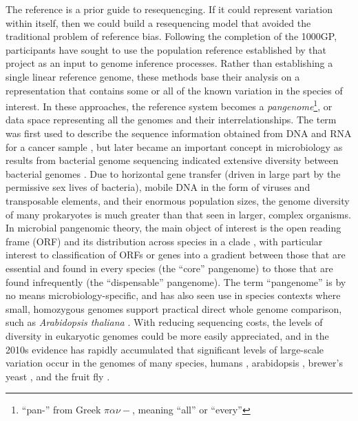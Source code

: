 The reference is a prior guide to resequencging.
If it could represent variation within itself, then we could build a resequencing model that avoided the traditional problem of reference bias.
Following the completion of the 1000GP, participants have sought to use the population reference established by that project as an input to genome inference processes.
Rather than establishing a single linear reference genome, these methods base their analysis on a representation that contains some or all of the known variation in the species of interest.
In these approaches, the reference system becomes a \emph{pangenome}\footnote{``pan-'' from Greek $\pi\alpha\nu-$, meaning ``all'' or ``every''}, or data space representing all the genomes and their interrelationships.
The term was first used to describe the sequence information obtained from DNA and RNA for a cancer sample \cite{sigaux2000cancer}, but later became an important concept in microbiology as results from bacterial genome sequencing indicated extensive diversity between bacterial genomes \cite{tettelin2005genome,medini2005microbial}.
Due to horizontal gene transfer (driven in large part by the permissive sex lives of bacteria), mobile DNA in the form of viruses and transposable elements, and their enormous population sizes, the genome diversity of many prokaryotes is much greater than that seen in larger, complex organisms.
In microbial pangenomic theory, the main object of interest is the open reading frame (ORF) and its distribution across species in a clade \cite{vernikos2015ten}, with particular interest to classification of ORFs or genes into a gradient between those that are essential and found in every species (the ``core'' pangenome) to those that are found infrequently (the ``dispensable'' pangenome).
The term ``pangenome'' is by no means microbiology-specific, and has also seen use in species contexts where small, homozygous genomes support practical direct whole genome comparison, such as \emph{Arabidopsis thaliana} \cite{cao2011whole}.
With reducing sequencing costs, the levels of diversity in eukaryotic genomes could be more easily appreciated, and in the 2010s evidence has rapidly accumulated that significant levels of large-scale variation occur in the genomes of many species, humans \cite{sudmant2010,sudmant2015integrated,chaisson2018multi}, arabidopsis \cite{alonso2016arabidopsis}, brewer's yeast \cite{yue2017contrasting}, and the fruit fly \cite{chakraborty2018hidden}.

